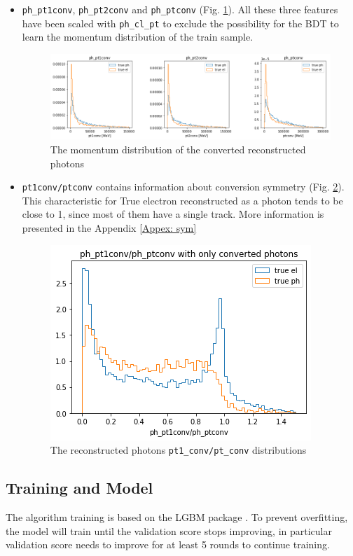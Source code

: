 \documentclass[a4paper, oneside, 11pt, openright]{book}
\begin{document}
\begin{itemize}
						\item \texttt{ph\_pt1conv}, \texttt{ph\_pt2conv} and \texttt{ph\_ptconv} (Fig. \ref{fig: ph_pts}). All these three features have been scaled with \texttt{ph\_cl\_pt} to exclude the possibility for the BDT to learn the momentum distribution of the train sample. 
						
						\begin{figure}[h!]	
							\centering
							\includegraphics[width=1.\linewidth]{tesi_images/ph_pts.png} 
							\caption{The momentum distribution of the converted reconstructed photons} 
							\label{fig: ph_pts}
						\end{figure}
						
						\item \texttt{pt1conv/ptconv} contains information about conversion symmetry (Fig. \ref{fig: pt1_pt}). This characteristic for True electron reconstructed as a photon tends to be close to 1, since most of them have a single track. More information is presented in the Appendix \ref{Appex: sym}
						
						\begin{figure}[h!]	
							\centering
							\includegraphics[width=.5\linewidth]{tesi_images/pt1_pt.png} 
							\caption{The reconstructed photons \texttt{pt1\_conv/pt\_conv} distributions} 
							\label{fig: pt1_pt}
						\end{figure}
					\end{itemize}
			\subsection{Training and Model}
			The algorithm training is based on the LGBM package \cite{LGBM}. %
			To prevent overfitting, the model will train until the validation score stops improving, in particular validation score needs to improve for at least 5 rounds to continue training.
			
\end{document}

